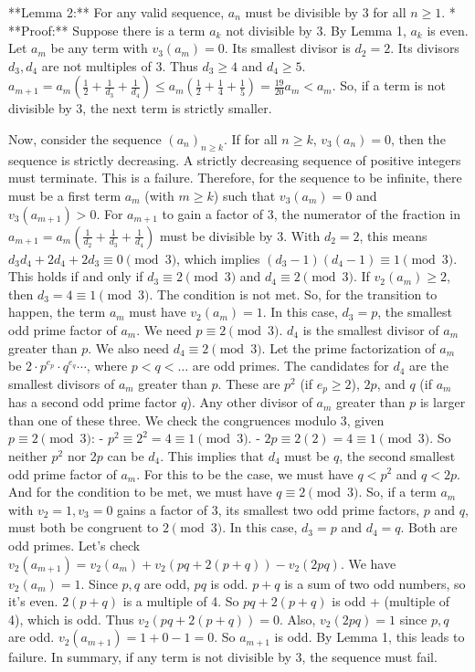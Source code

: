 \documentclass[12pt]{article}
\begin{document}
**Lemma 2:** For any valid sequence, $a_n$ must be divisible by 3 for all $n \ge 1$.
*   **Proof:** Suppose there is a term $a_k$ not divisible by 3. By Lemma 1, $a_k$ is even.
    Let $a_m$ be any term with $v_3(a_m)=0$. Its smallest divisor is $d_2=2$. Its divisors $d_3, d_4$ are not multiples of 3. Thus $d_3 \ge 4$ and $d_4 \ge 5$.
    $a_{m+1} = a_m(\frac{1}{2}+\frac{1}{d_3}+\frac{1}{d_4}) \le a_m(\frac{1}{2}+\frac{1}{4}+\frac{1}{5}) = \frac{19}{20}a_m < a_m$.
    So, if a term is not divisible by 3, the next term is strictly smaller.

    Now, consider the sequence $(a_n)_{n \ge k}$.
    If for all $n \ge k$, $v_3(a_n)=0$, then the sequence is strictly decreasing. A strictly decreasing sequence of positive integers must terminate. This is a failure.
    Therefore, for the sequence to be infinite, there must be a first term $a_m$ (with $m \ge k$) such that $v_3(a_m)=0$ and $v_3(a_{m+1})>0$.
    For $a_{m+1}$ to gain a factor of 3, the numerator of the fraction in $a_{m+1} = a_m(\frac{1}{d_2}+\frac{1}{d_3}+\frac{1}{d_4})$ must be divisible by 3. With $d_2=2$, this means $d_3d_4+2d_4+2d_3 \equiv 0 \pmod 3$, which implies $(d_3-1)(d_4-1) \equiv 1 \pmod 3$. This holds if and only if $d_3 \equiv 2 \pmod 3$ and $d_4 \equiv 2 \pmod 3$.
    If $v_2(a_m) \ge 2$, then $d_3=4 \equiv 1 \pmod 3$. The condition is not met.
    So, for the transition to happen, the term $a_m$ must have $v_2(a_m)=1$.
    In this case, $d_3=p$, the smallest odd prime factor of $a_m$. We need $p \equiv 2 \pmod 3$.
    $d_4$ is the smallest divisor of $a_m$ greater than $p$. We also need $d_4 \equiv 2 \pmod 3$.
    Let the prime factorization of $a_m$ be $2 \cdot p^{e_p} \cdot q^{e_q} \cdots$, where $p < q < \dots$ are odd primes.
    The candidates for $d_4$ are the smallest divisors of $a_m$ greater than $p$. These are $p^2$ (if $e_p \ge 2$), $2p$, and $q$ (if $a_m$ has a second odd prime factor $q$). Any other divisor of $a_m$ greater than $p$ is larger than one of these three.
    We check the congruences modulo 3, given $p \equiv 2 \pmod 3$:
    - $p^2 \equiv 2^2 = 4 \equiv 1 \pmod 3$.
    - $2p \equiv 2(2) = 4 \equiv 1 \pmod 3$.
    So neither $p^2$ nor $2p$ can be $d_4$.
    This implies that $d_4$ must be $q$, the second smallest odd prime factor of $a_m$. For this to be the case, we must have $q < p^2$ and $q < 2p$. And for the condition to be met, we must have $q \equiv 2 \pmod 3$.
    So, if a term $a_m$ with $v_2=1, v_3=0$ gains a factor of 3, its smallest two odd prime factors, $p$ and $q$, must both be congruent to $2 \pmod 3$.
    In this case, $d_3=p$ and $d_4=q$. Both are odd primes.
    Let's check $v_2(a_{m+1}) = v_2(a_m) + v_2(pq+2(p+q)) - v_2(2pq)$.
    We have $v_2(a_m)=1$. Since $p, q$ are odd, $pq$ is odd. $p+q$ is a sum of two odd numbers, so it's even. $2(p+q)$ is a multiple of 4. So $pq+2(p+q)$ is odd + (multiple of 4), which is odd. Thus $v_2(pq+2(p+q)) = 0$. Also, $v_2(2pq) = 1$ since $p,q$ are odd.
    $v_2(a_{m+1}) = 1 + 0 - 1 = 0$.
    So $a_{m+1}$ is odd. By Lemma 1, this leads to failure.
    In summary, if any term is not divisible by 3, the sequence must fail.
\end{document}
